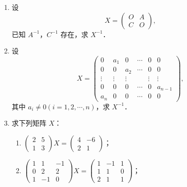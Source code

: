\begin{enumerate}
\begin{enumerate}
  \anssub
    \item $A=\begin{pmatrix}0&0&1&-1\\0&3&1&4\\2&7&6&-1\\1&2&2&-1\end{pmatrix}$；
  \anssub
    \item $A=\begin{pmatrix}2&1&0&0&0\\0&2&1&0&0\\0&0&2&1&0\\0&0&0&2&1\\0&0&0&0&2\end{pmatrix}$．
  \anssub
  \end{enumerate}
  \item 设
  \[
    X=\begin{pmatrix}O&A\\C&O\end{pmatrix},
  \]
  已知 $A^{-1}$，$C^{-1}$ 存在，求 $X^{-1}$．
  \anscompute
  \item 设
  \[
    X=\begin{pmatrix}
      0&a_1&0&\cdots&0&0\\
      0&0&a_2&\cdots&0&0\\
      \vdots&\vdots&\vdots&&\vdots&\vdots\\
      0&0&0&\cdots&0&a_{n-1}\\
      a_n&0&0&\cdots&0&0
    \end{pmatrix},
  \]
  其中 $a_i\neq0(i=1,2,\cdots,n)$，求 $X^{-1}$．
  \anscompute
  \item 求下列矩阵 $X$：
  \begin{enumerate}
    \item $\begin{pmatrix}2&5\\1&3\end{pmatrix}X=\begin{pmatrix}4&-6\\2&1\end{pmatrix}$；
  \anssub
    \item $\begin{pmatrix}1&1&-1\\0&2&2\\1&-1&0\end{pmatrix}X=\begin{pmatrix}1&-1&1\\1&1&0\\2&1&1\end{pmatrix}$；

\end{enumerate}
\end{enumerate}
